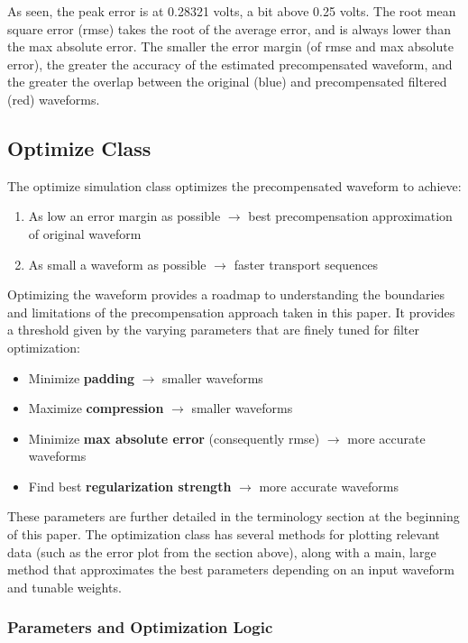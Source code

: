 As seen, the peak error is at 0.28321 volts, a bit above 0.25 volts. The root mean square error (rmse) takes the root of the average error, and is always lower than the max absolute error. The smaller the error margin (of rmse and max absolute error), the greater the accuracy of the estimated precompensated waveform, and the greater the overlap between the original (blue) and precompensated filtered (red) waveforms.

\subsection{Optimize Class}

The optimize simulation class optimizes the precompensated waveform to achieve:

\begin{enumerate}
    \item As low an error margin as possible $\rightarrow$ best precompensation approximation of original waveform
    \item As small a waveform as possible $\rightarrow$ faster transport sequences
\end{enumerate}

Optimizing the waveform provides a roadmap to understanding the boundaries and limitations of the precompensation approach taken in this paper. It provides a threshold given by the varying parameters that are finely tuned for filter optimization:

\begin{itemize}
    \item Minimize \textbf{padding} $\rightarrow$ smaller waveforms
    \item Maximize \textbf{compression} $\rightarrow$ smaller waveforms
    \item Minimize \textbf{max absolute error} (consequently rmse) $\rightarrow$ more accurate waveforms
    \item Find best \textbf{regularization strength} $\rightarrow$ more accurate waveforms
\end{itemize}

These parameters are further detailed in the terminology section at the beginning of this paper. The optimization class has several methods for plotting relevant data (such as the error plot from the section above), along with a main, large method that approximates the best parameters depending on an input waveform and tunable weights.

\subsubsection{Parameters and Optimization Logic}

